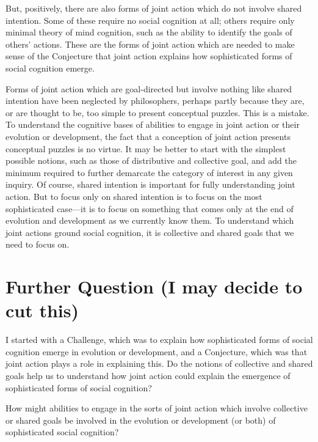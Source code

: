 \documentclass[12pt,a4paper]{extarticle}
\begin{document}
But, positively, there are also forms of joint action which do not involve shared intention.
Some of these require no social cognition at all; others require only minimal theory of mind cognition, such as the ability to identify the goals of others' actions.
These are the forms of joint action which are needed to make sense of the Conjecture that joint action explains how sophisticated forms of social cognition emerge.

Forms of joint action which are goal-directed but involve nothing like shared intention have been neglected by philosophers, perhaps 
partly because they are, or are thought to be, too simple to present conceptual puzzles.
This is a mistake.  
To understand the cognitive bases of abilities to engage in joint action or their evolution or development, the fact that a conception of joint action presents conceptual puzzles is no virtue.
It may be better to start with the simplest possible notions, such as those of distributive and collective goal, and add the minimum required to further demarcate the category of interest in any given inquiry.
Of course, shared intention is important for  fully understanding joint action.
But to focus only on shared intention is to focus on the most sophisticated case---it is to focus on something that comes only at the end of evolution and development as we currently know them.
To understand which joint actions ground social cognition, it is  collective and shared goals that we need to focus on. 





\section{Further Question (I may decide to cut this)}
I started with a Challenge, which was to explain how sophisticated forms of social cognition emerge in evolution or development, 
and a Conjecture, which was that joint action plays a role in explaining this.
Do the notions of collective and shared goals help us to understand how joint action could explain the emergence of sophisticated forms of social cognition?

How might abilities to engage in the sorts of joint action 
which involve collective or shared goals 
be involved in the evolution or development (or both) of sophisticated social cognition?
\end{document}
